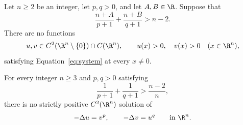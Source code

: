 \begin{theorem}\label{thm:main}
Let \(n\ge2\) be an integer, let \(p,q>0\), and let \(A,B\in\R\).
Suppose that
\begin{equation}\label{eq:subcritical}
 \frac{n+A}{p+1}+\frac{n+B}{q+1}>n-2.
\end{equation}
There are no functions
\[
 u,v\in C^2(\R^n\setminus\{0\})\cap C(\R^n),
 \qquad u(x)>0,\quad v(x)>0\quad(x\in\R^n),
\]
satisfying Equation~\eqref{eq:system} at every \(x\ne0\).
\end{theorem}

\begin{corollary}
\label{cor:lane-emden}
For every integer \(n\ge3\) and \(p,q>0\) satisfying
\[
 \frac{1}{p+1}+\frac{1}{q+1}>\frac{n-2}{n},
\]
there is no strictly positive \(C^2(\R^n)\) solution of
\[
 -\Delta u=v^p,\qquad -\Delta v=u^q\qquad\text{in }\R^n.
\]
\end{corollary}
